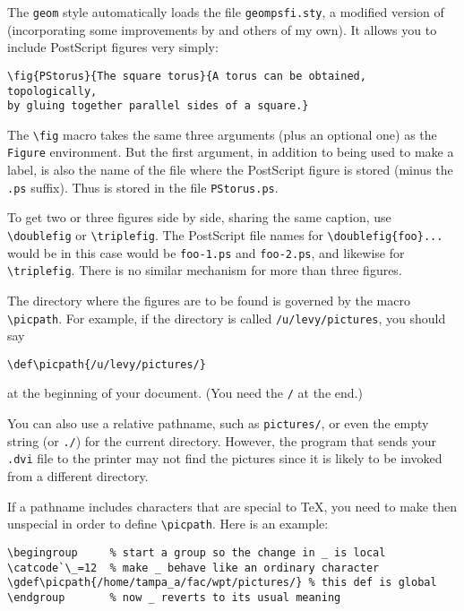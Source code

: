 The \verb+geom+ style automatically loads the file
\verb+geompsfi.sty+, a modified version of 
(incorporating some improvements by  and
others of my own).  It allows you to include PostScript figures very
simply: 
%
\begin{verbatim}
\fig{PStorus}{The square torus}{A torus can be obtained, topologically,
by gluing together parallel sides of a square.}
\end{verbatim}
%

The \verb+\fig+ macro takes the same three arguments (plus an optional
one) as the \verb+Figure+ environment.  But the first argument, in
addition to being used to make a label, is also the name of the file
where the PostScript figure is stored (minus the \verb+.ps+ suffix).
Thus  is stored in the file \verb+PStorus.ps+.

To get two or three figures side by side, sharing the same caption,
use \verb+\doublefig+ or \verb+\triplefig+.  The PostScript file names
for \verb+\doublefig{foo}...+ would be in this case would be
\verb+foo-1.ps+ and \verb+foo-2.ps+, and likewise for
\verb+\triplefig+.  There is no similar mechanism for more than three
figures.

The directory where the figures are to be found is governed by the
macro \verb+\picpath+.  For example, if the directory is
called \verb+/u/levy/pictures+, you should say 
\begin{verbatim}
\def\picpath{/u/levy/pictures/}
\end{verbatim}
at the beginning of your document.  (You need the \verb+/+ at the end.)

\begin{wizard}
You can also use a relative pathname, such as \verb+pictures/+, or even
the empty string (or \verb+./+) for the current directory.  
However, the program that sends
your \verb+.dvi+ file to the printer may not find the pictures since
it is likely to be invoked from a different directory.

If a pathname includes characters that are special to \TeX, you need
to make then unspecial in order to define \verb+\picpath+.  Here is an
example: 
\begin{verbatim}
\begingroup     % start a group so the change in _ is local
\catcode`\_=12  % make _ behave like an ordinary character
\gdef\picpath{/home/tampa_a/fac/wpt/pictures/} % this def is global
\endgroup       % now _ reverts to its usual meaning
\end{verbatim}
\end{wizard}

